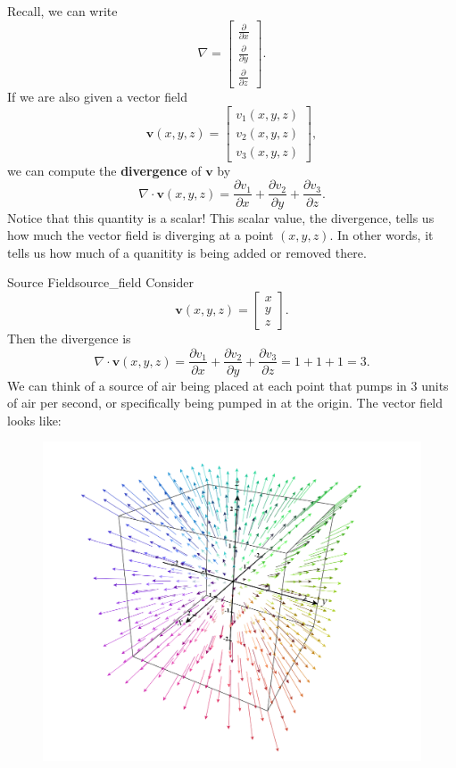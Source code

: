         Recall, we can write
        \[
        \nabla = \begin{bmatrix} \frac{\partial}{\partial x} \\ \frac{\partial}{\partial y} \\ \frac{\partial}{\partial z} \end{bmatrix}.
        \]
        If we are also given a vector field
        \[
        \mathbf{v}(x,y,z) = \begin{bmatrix} v_1(x,y,z) \\ v_2(x,y,z) \\ v_3(x,y,z) \end{bmatrix},
        \]
        we can compute the \textbf{divergence} of $\mathbf{v}$ by
        \[
        \nabla \cdot \mathbf{v}(x,y,z) = \frac{\partial v_1}{\partial x} + \frac{\partial v_2}{\partial y} + \frac{\partial v_3}{\partial z}.
        \]
        Notice that this quantity is a scalar!  This scalar value, the divergence, tells us how much the vector field is diverging at a point $(x,y,z)$. In other words, it tells us how much of a quanitity is being added or removed there.
        
        \begin{ex}{Source Field}{source_field}
        Consider
        \[
        \mathbf{v}(x,y,z) = \begin{bmatrix} x \\ y \\ z \end{bmatrix}.
        \]
        Then the divergence is
        \[
        \nabla \cdot \mathbf{v}(x,y,z) = \frac{\partial v_1}{\partial x} + \frac{\partial v_2}{\partial y} + \frac{\partial v_3}{\partial z} = 1 + 1 + 1 = 3.
        \]
        We can think of a source of air being placed at each point that pumps in $3$ units of air per second, or specifically being pumped in at the origin. The vector field looks like:
        \begin{figure}[H]
            \centering
            \includegraphics[width=.6\textwidth]{Figures/divergence_field.png}
        \end{figure}
        \end{ex}
        
